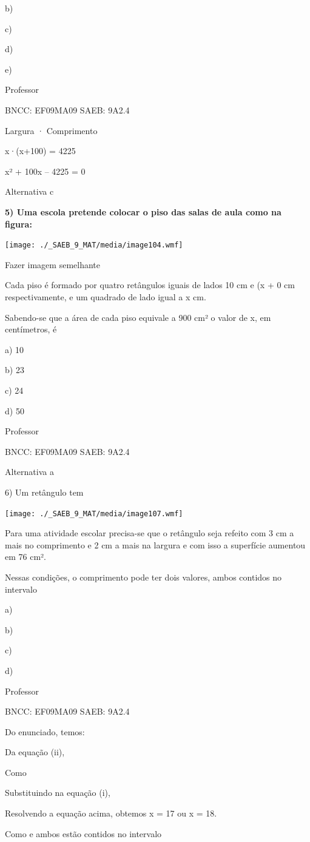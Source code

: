\begin{escolha}
{{{\begin{escolha}
{b)

c)

d)

e)

Professor

BNCC: EF09MA09 SAEB: 9A2.4

Largura · Comprimento

x·(x+100) = 4225

x² + 100x -- 4225 = 0

Alternativa c

\textbf{5) Uma escola pretende colocar o piso das salas de aula como na
figura:}

\texttt{[image: ./\_SAEB\_9\_MAT/media/image104.wmf]}

Fazer imagem semelhante

Cada piso é formado por quatro retângulos iguais de lados 10 cm e (x +
\num{0} cm respectivamente, e um quadrado de lado igual a x cm.

Sabendo-se que a área de cada piso equivale a 900 cm² o valor de x, em
centímetros, é

a) 10

b) 23

c) 24

d) 50

Professor

BNCC: EF09MA09 SAEB: 9A2.4

Alternativa a

6) Um retângulo tem

\texttt{[image: ./\_SAEB\_9\_MAT/media/image107.wmf]}

Para uma atividade escolar precisa-se que o retângulo seja refeito com 3
cm a mais no comprimento e 2 cm a mais na largura e com isso a
superfície aumentou em 76 cm².

Nessas condições, o comprimento pode ter dois valores, ambos contidos no
intervalo

a)

b)

c)

d)

Professor

BNCC: EF09MA09 SAEB: 9A2.4

Do enunciado, temos:

Da equação (ii),

Como

Substituindo na equação (i),

Resolvendo a equação acima, obtemos x = 17 ou x = 18.

Como e ambos estão contidos no intervalo

}
\end{escolha}}}}
\end{escolha}
